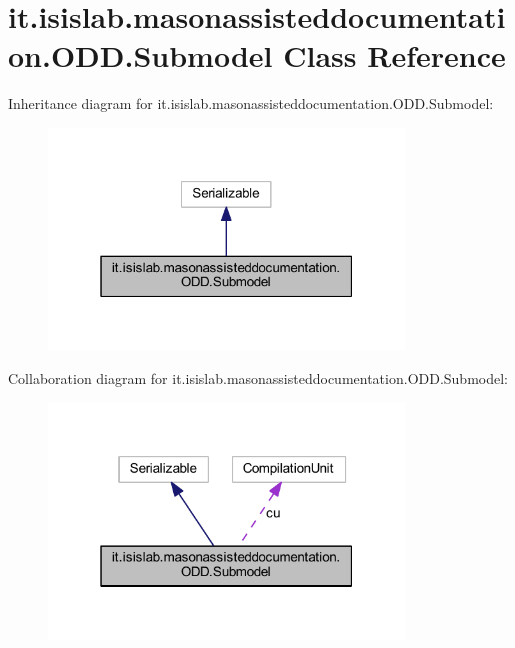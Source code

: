 \hypertarget{classit_1_1isislab_1_1masonassisteddocumentation_1_1_o_d_d_1_1_submodel}{\section{it.\-isislab.\-masonassisteddocumentation.\-O\-D\-D.\-Submodel Class Reference}
\label{classit_1_1isislab_1_1masonassisteddocumentation_1_1_o_d_d_1_1_submodel}
}


Inheritance diagram for it.\-isislab.\-masonassisteddocumentation.\-O\-D\-D.\-Submodel\-:
\nopagebreak
\begin{figure}[H]
\begin{center}
\leavevmode
\includegraphics[width=268pt]{classit_1_1isislab_1_1masonassisteddocumentation_1_1_o_d_d_1_1_submodel__inherit__graph}
\end{center}
\end{figure}


Collaboration diagram for it.\-isislab.\-masonassisteddocumentation.\-O\-D\-D.\-Submodel\-:
\nopagebreak
\begin{figure}[H]
\begin{center}
\leavevmode
\includegraphics[width=268pt]{classit_1_1isislab_1_1masonassisteddocumentation_1_1_o_d_d_1_1_submodel__coll__graph}
\end{center}
\end{figure}
